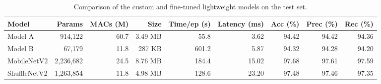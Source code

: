 \begin{table}[h]
\centering
\caption{Comparison of the custom and fine-tuned lightweight models on the test set.}
\label{tab:comparison}
\begin{tabular}{lrrrrrrrr}
\hline
Model & Params & MACs (M) & Size & Time/ep (s) & Latency (ms) & Acc (\%) & Prec (\%) & Rec (\%) \\
\hline
Model A & 914,122 & 60.7 & 3.49 MB & 55.8 & 3.62 & 94.42 & 94.42 & 94.36 \\
Model B & 67,179 & 11.8 & 287 KB & 601.2 & 5.87 & 94.32 & 94.28 & 94.20 \\
MobileNetV2 & 2,236,682 & 24.5 & 8.76 MB & 184.4 & 15.02 & 97.68 & 97.61 & 97.59 \\
ShuffleNetV2 & 1,263,854 & 11.8 & 4.98 MB & 128.6 & 23.20 & 97.48 & 97.46 & 97.35 \\
\hline
\end{tabular}
\end{table}